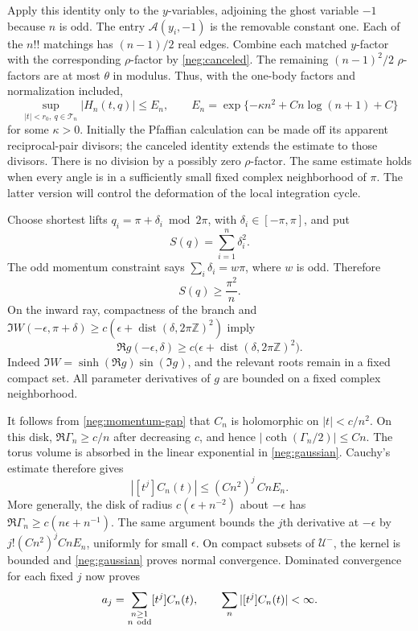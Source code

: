 \documentclass[11pt]{article}
\numberwithin{equation}{section}
\theoremstyle{definition}
\newcommand{\Z}{\mathbb Z}
\begin{document}
Apply this identity only to the \(y\)-variables, adjoining the
ghost variable \(-1\) because \(n\) is odd.  The entry
\(\mathcal A(y_i,-1)\) is the removable constant one.
Each of the \(n!!\) matchings has \((n-1)/2\) real edges.
Combine each matched \(y\)-factor with the corresponding
\(\rho\)-factor by \eqref{neg:canceled}.  The remaining
\((n-1)^2/2\) \(\rho\)-factors are at most \(\theta\) in modulus.
Thus, with the one-body factors and normalization included,
\begin{equation}
 \sup_{|t|<r_0,\ q\in\mathcal T_n}|H_n(t,q)|
 \le E_n,\qquad
 E_n=\exp\{-\kappa n^2+C n\log(n+1)+C\}
 \label{neg:gaussian}
\end{equation}
for some \(\kappa>0\).  Initially the Pfaffian calculation can be
made off its apparent reciprocal-pair divisors; the canceled
identity extends the estimate to those divisors.  There is no
division by a possibly zero \(\rho\)-factor.  The same estimate
holds when every angle is in a sufficiently small fixed complex
neighborhood of \(\pi\).  The latter version will control the
deformation of the local integration cycle.

Choose shortest lifts \(q_i=\pi+\delta_i\bmod2\pi\), with
\(\delta_i\in[-\pi,\pi]\), and put
\[
 S(q)=\sum_{i=1}^n\delta_i^2 .
 \]
The odd momentum constraint says
\(\sum_i\delta_i=w\pi\), where \(w\) is odd.  Therefore
\begin{equation}
 S(q)\ge\frac{\pi^2}{n}.
 \label{neg:momentum-gap}
\end{equation}
On the inward ray, compactness of the branch and
\(\Im W(-\epsilon,\pi+\delta)\ge
c(\epsilon+\operatorname{dist}(\delta,2\pi\Z)^2)\) imply
\begin{equation}
 \Re g(-\epsilon,\delta)
 \ge c\bigl(\epsilon+\operatorname{dist}(\delta,2\pi\Z)^2\bigr).
 \label{neg:attenuation}
\end{equation}
Indeed \(\Im W=\sinh(\Re g)\sin(\Im g)\), and the relevant roots
remain in a fixed compact set.  All parameter derivatives of \(g\)
are bounded on a fixed complex neighborhood.

It follows from \eqref{neg:momentum-gap} that \(C_n\) is holomorphic
on \(|t|<c/n^2\).  On this disk,
\(\Re\Gamma_n\ge c/n\) after decreasing \(c\), and hence
\(|\coth(\Gamma_n/2)|\le Cn\).  The torus volume is absorbed in
the linear exponential in \eqref{neg:gaussian}.  Cauchy's estimate
therefore gives
\begin{equation}
 |[t^j]C_n(t)|\le (Cn^2)^j\,CnE_n .
 \label{neg:small-disk}
\end{equation}
More generally, the disk of radius \(c(\epsilon+n^{-2})\) about
\(-\epsilon\) has
\(\Re\Gamma_n\ge c(n\epsilon+n^{-1})\).  The same argument bounds
the \(j\)th derivative at \(-\epsilon\) by
\(j!(Cn^2)^j CnE_n\), uniformly for small \(\epsilon\).
On compact subsets of \(\mathcal U^-\), the kernel is bounded and
\eqref{neg:gaussian} proves normal convergence.  Dominated
convergence for each fixed \(j\) now proves
\begin{equation}
 a_j=\sum_{\substack{n\ge1\\n\ {\rm odd}}}[t^j]C_n(t),
 \qquad
 \sum_n |[t^j]C_n(t)|<\infty .
 \label{neg:jet-sum}
\end{equation}
\end{document}
